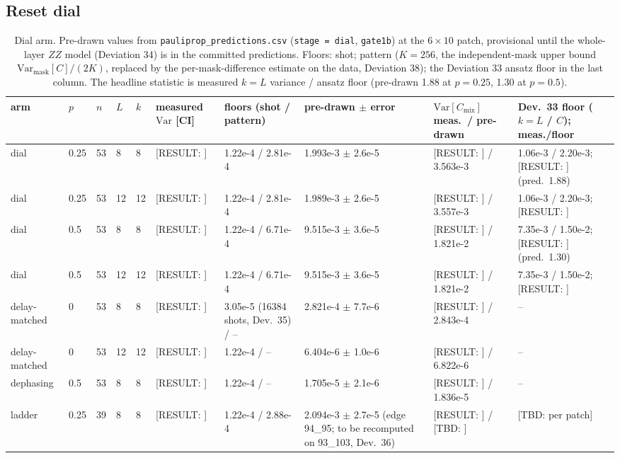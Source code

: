 \documentclass[aps,prxquantum,reprint,superscriptaddress,nofootinbib,longbibliography,amsmath,amssymb]{revtex4-2}
\newcommand{\placeholder}[1]{\textcolor{red!70!black}{[RESULT: #1]}}
\newcommand{\tbd}[1]{\textcolor{orange!80!black}{[TBD: #1]}}
\newcommand{\Var}{\mathrm{Var}}
\newcommand{\Cmix}{C_{\mathrm{mix}}}
\begin{document}
\subsection{Reset dial}
\begin{table}[t]
\caption{Dial arm. Pre-drawn values from \texttt{pauliprop\_predictions.csv} (\texttt{stage = dial}, \texttt{gate1b}) at the $6\times10$ patch, provisional until the whole-layer $ZZ$ model (Deviation 34) is in the committed predictions. Floors: shot; pattern ($K = 256$, the independent-mask upper bound $\Var_{\mathrm{mask}}[C]/(2K)$, replaced by the per-mask-difference estimate on the data, Deviation 38); the Deviation 33 ansatz floor in the last column. The headline statistic is measured $k = L$ variance / ansatz floor (pre-drawn 1.88 at $p = 0.25$, 1.30 at $p = 0.5$). \label{tab:dial}}
\begin{ruledtabular}
\begin{tabular}{llllllllll}
arm & $p$ & $n$ & $L$ & $k$ & measured $\Var$ [CI] & floors (shot / pattern) & pre-drawn $\pm$ error & $\Var[\Cmix]$ meas.\ / pre-drawn & Dev.\ 33 floor ($k{=}L$ / $C$); meas./floor \\
\hline
dial & 0.25 & 53 & 8 & 8 & \placeholder{} & 1.22e-4 / 2.81e-4 & 1.993e-3 $\pm$ 2.6e-5 & \placeholder{} / 3.563e-3 & 1.06e-3 / 2.20e-3; \placeholder{} (pred.\ 1.88) \\
dial & 0.25 & 53 & 12 & 12 & \placeholder{} & 1.22e-4 / 2.81e-4 & 1.989e-3 $\pm$ 2.6e-5 & \placeholder{} / 3.557e-3 & 1.06e-3 / 2.20e-3; \placeholder{} \\
dial & 0.5 & 53 & 8 & 8 & \placeholder{} & 1.22e-4 / 6.71e-4 & 9.515e-3 $\pm$ 3.6e-5 & \placeholder{} / 1.821e-2 & 7.35e-3 / 1.50e-2; \placeholder{} (pred.\ 1.30) \\
dial & 0.5 & 53 & 12 & 12 & \placeholder{} & 1.22e-4 / 6.71e-4 & 9.515e-3 $\pm$ 3.6e-5 & \placeholder{} / 1.821e-2 & 7.35e-3 / 1.50e-2; \placeholder{} \\
delay-matched & 0 & 53 & 8 & 8 & \placeholder{} & 3.05e-5 (16384 shots, Dev.\ 35) / -- & 2.821e-4 $\pm$ 7.7e-6 & \placeholder{} / 2.843e-4 & -- \\
delay-matched & 0 & 53 & 12 & 12 & \placeholder{} & 1.22e-4 / -- & 6.404e-6 $\pm$ 1.0e-6 & \placeholder{} / 6.822e-6 & -- \\
dephasing & 0.5 & 53 & 8 & 8 & \placeholder{} & 1.22e-4 / -- & 1.705e-5 $\pm$ 2.1e-6 & \placeholder{} / 1.836e-5 & -- \\
ladder & 0.25 & 39 & 8 & 8 & \placeholder{} & 1.22e-4 / 2.88e-4 & 2.094e-3 $\pm$ 2.7e-5 (edge 94\_95; to be recomputed on 93\_103, Dev.\ 36) & \placeholder{} / \tbd{} & \tbd{per patch} \\

\end{tabular}
\end{ruledtabular}
\end{table}
\end{document}
